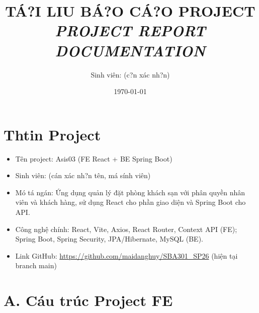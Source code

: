\documentclass[12pt,a4paper]{article}
\title{T\'A?I LI\?U B\'A?O C\'A?O PROJECT\\
       \large{\textit{PROJECT REPORT DOCUMENTATION}}}
\author{Sinh vi\^en: (c?n x\'ac nh?n)}
\date{\today}
\begin{document}
\maketitle
\thispagestyle{empty}
\newpage

\tableofcontents
\newpage

\section{Th tin Project}
\begin{itemize}
    \item T\^en project: Asis03 (FE React + BE Spring Boot)
    \item Sinh vi\^en: (c\'an x\'ac nh?n t\^en, m\'a s\'inh vi\^en)
    \item M\'o t\'a ng\'an: Ứng dụng quản lý đặt phòng khách sạn với phân quyền nhân viên và khách hàng,
    sử dụng React cho phần giao diện và Spring Boot cho API.
    \item Công nghệ chính: React, Vite, Axios, React Router, Context API (FE); Spring Boot,
    Spring Security, JPA/Hibernate, MySQL (BE).
    \item Link GitHub: \url{https://github.com/maidanghuy/SBA301_SP26} (hiện tại branch main)
\end{itemize}

\section*{A. C\'au tr\'uc Project FE}
\end{document}
